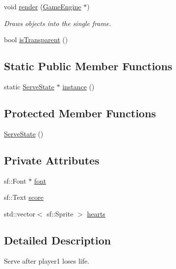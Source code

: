 \begin{DoxyCompactItemize}
void \mbox{\hyperlink{class_serve_state_a91cd889069e5b9f073ac33addeed2913}{render}} (\mbox{\hyperlink{class_game_engine}{Game\+Engine}} $\ast$)
\begin{DoxyCompactList}\small\item\em Draws objects into the single frame. \end{DoxyCompactList}\item 
bool \mbox{\hyperlink{class_serve_state_aad809c6fa11b502fa20403dc62b6601a}{is\+Transparent}} ()
\end{DoxyCompactItemize}
\subsection*{Static Public Member Functions}
\begin{DoxyCompactItemize}
\item 
static \mbox{\hyperlink{class_serve_state}{Serve\+State}} $\ast$ \mbox{\hyperlink{class_serve_state_ac0f3ead67813e13e2a84026162da3b7c}{instance}} ()
\end{DoxyCompactItemize}
\subsection*{Protected Member Functions}
\begin{DoxyCompactItemize}
\item 
\mbox{\hyperlink{class_serve_state_a4c147afd3a49deed30013aaad7052383}{Serve\+State}} ()
\end{DoxyCompactItemize}
\subsection*{Private Attributes}
\begin{DoxyCompactItemize}
\item 
sf\+::\+Font $\ast$ \mbox{\hyperlink{class_serve_state_ae82617584b22ac05ab6991e3a8fe3c55}{font}}
\item 
sf\+::\+Text \mbox{\hyperlink{class_serve_state_a914184b17c9c3b7cc3c6b584173cefde}{score}}
\item 
std\+::vector$<$ sf\+::\+Sprite $>$ \mbox{\hyperlink{class_serve_state_aa3ee7e1197bb8e6eab60c04bf8454092}{hearts}}
\end{DoxyCompactItemize}


\subsection{Detailed Description}
Serve after player1 loses life. 


